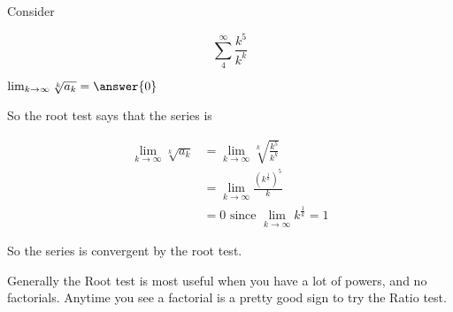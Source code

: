 \documentclass{ximera}
\begin{document}
\begin{question}
	Consider 
	
	\[
	 \sum_4^\infty \frac{k^5}{k^k}
	\]
	

	 $\lim_{k \to \infty} \sqrt[k]{a_k} = \answer{0}$	
	 
	 So the root test says that the series is
	 
	 \begin{multipleChoice}
	\end{multipleChoice}	
	
	\begin{hint}
		\begin{align*}
			\lim_{k \to \infty} \sqrt[k]{a_k} &= \lim_{k \to \infty} \sqrt[k]{\frac{k^5}{k^k}}\\
				&=\lim_{k \to \infty} \frac{(k^{\frac{1}{k}})^5}{k}\\
				&=0 \textrm{ since $\lim_{k \to \infty} k^\frac{1}{k} = 1$}
	\end{align*}
	
	So the series is convergent by the root test.
	\end{hint}
\end{question}

Generally the Root test is most useful when you have a lot of powers, and no factorials.  Anytime you see a factorial is a pretty good sign to try the Ratio test.
\end{document}

